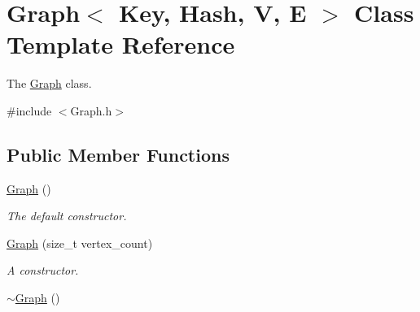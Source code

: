 \hypertarget{class_graph}{\section{Graph$<$ Key, Hash, V, E $>$ Class Template Reference}
\label{class_graph}
}


The \hyperlink{class_graph}{Graph} class.  




{\ttfamily \#include $<$Graph.\+h$>$}

\subsection*{Public Member Functions}
\begin{DoxyCompactItemize}
\item 
\hyperlink{class_graph_a8af5978e194f7b3b86d0c43b8e6c87cc}{Graph} ()
\begin{DoxyCompactList}\small\item\em The default constructor. \end{DoxyCompactList}\item 
\hyperlink{class_graph_aa89b04c5cde59bdc94357eb33ae6ae6a}{Graph} (size\+\_\+t vertex\+\_\+count)
\begin{DoxyCompactList}\small\item\em A constructor. \end{DoxyCompactList}\item 
\hypertarget{class_graph_a6eff1780982d97b034429a7e367c6553}{\hyperlink{class_graph_a6eff1780982d97b034429a7e367c6553}{$\sim$\+Graph} ()}\label{class_graph_a6eff1780982d97b034429a7e367c6553}


\end{DoxyCompactItemize}
